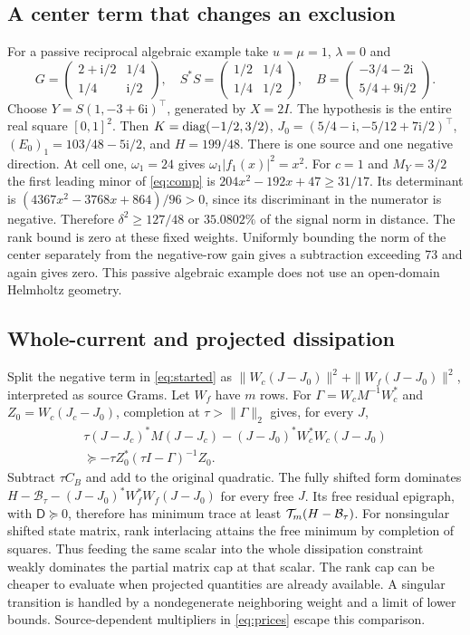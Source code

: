 \subsection*{A center term that changes an exclusion}

For a passive reciprocal algebraic example take $u=\mu=1$, $\lambda=0$ and
\[
 G=\begin{pmatrix}2+\mathrm i/2&1/4\\1/4&\mathrm i/2\end{pmatrix},\quad
 S^*S=\begin{pmatrix}1/2&1/4\\1/4&1/2\end{pmatrix},\quad
 B=\begin{pmatrix}-3/4-2\mathrm i\\5/4+9\mathrm i/2\end{pmatrix}.
\]
Choose $Y=S(1,-3+6\mathrm i)^\top$, generated by $X=2I$. The hypothesis is the entire real square $[0,1]^2$. Then $K=\operatorname{diag}(-1/2,3/2)$, $J_0=(5/4-\mathrm i,-5/12+7\mathrm i/2)^\top$, $(E_0)_1=103/48-5\mathrm i/2$, and $H=199/48$. There is one source and one negative direction. At cell one, $\omega_1=24$ gives $\omega_1|f_1(x)|^2=x^2$. For $c=1$ and $M_Y=3/2$ the first leading minor of \eqref{eq:comp} is $204x^2-192x+47\ge31/17$. Its determinant is $(4367x^2-3768x+864)/96>0$, since its discriminant in the numerator is negative. Therefore $\delta^2\ge127/48$ or $35.0802\%$ of the signal norm in distance. The rank bound is zero at these fixed weights. Uniformly bounding the norm of the center separately from the negative-row gain gives a subtraction exceeding 73 and again gives zero. This passive algebraic example does not use an open-domain Helmholtz geometry.

\subsection*{Whole-current and projected dissipation}

Split the negative term in \eqref{eq:started} as $\|W_c(J-J_0)\|^2+\|W_f(J-J_0)\|^2$, interpreted as source Grams. Let $W_f$ have $m$ rows. For $\Gamma=W_cM^{-1}W_c^*$ and $Z_0=W_c(J_c-J_0)$, completion at $\tau>\|\Gamma\|_2$ gives, for every $J$,
\begin{multline*}
 \tau(J-J_c)^*M(J-J_c)
 -(J-J_0)^*W_c^*W_c(J-J_0)\\
 \succeq-\tau Z_0^*(\tau I-\Gamma)^{-1}Z_0 .
\end{multline*}
Subtract $\tau C_B$ and add to the original quadratic. The fully shifted form dominates $H-\mathcal B_\tau-(J-J_0)^*W_f^*W_f(J-J_0)$ for every free $J$. Its free residual epigraph, with $\mathsf D\succeq0$, therefore has minimum trace at least $\mathcal T_m(H-\mathcal B_\tau)$. For nonsingular shifted state matrix, rank interlacing attains the free minimum by completion of squares. Thus feeding the same scalar into the whole dissipation constraint weakly dominates the partial matrix cap at that scalar. The rank cap can be cheaper to evaluate when projected quantities are already available. A singular transition is handled by a nondegenerate neighboring weight and a limit of lower bounds. Source-dependent multipliers in \eqref{eq:prices} escape this comparison.

